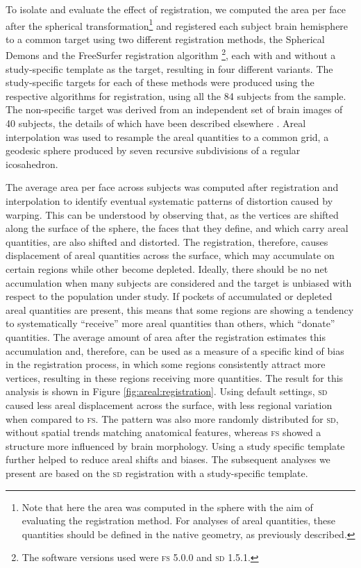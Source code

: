 To isolate and evaluate the effect of registration, we computed the area per face after the spherical transformation\footnote{Note that here the area was computed in the sphere with the aim of evaluating the registration method. For analyses of areal quantities, these quantities should be defined in the native geometry, as previously described.} and registered each subject brain hemisphere to a common target using two different registration methods, the Spherical Demons \citep{Yeo2010} and the FreeSurfer registration algorithm \citep{Fischl1999_intersubject}\footnote{The software versions used were \textsc{fs} 5.0.0 and \textsc{sd} 1.5.1.}, each with and without a study-specific template as the target, resulting in four different variants. The study-specific targets for each of these methods were produced using the respective algorithms for registration, using all the 84 subjects from the sample. The non-specific target was derived from an independent set of brain images of 40 subjects, the details of which have been described elsewhere \citep{Desikan2006}. Areal interpolation was used to resample the areal quantities to a common grid, a geodesic sphere produced by seven recursive subdivisions of a regular icosahedron.

The average area per face across subjects was computed after registration and interpolation to identify eventual systematic patterns of distortion caused by warping. This can be understood by observing that, as the vertices are shifted along the surface of the sphere, the faces that they define, and which carry areal quantities, are also shifted and distorted. The registration, therefore, causes displacement of areal quantities across the surface, which may accumulate on certain regions while other become depleted. Ideally, there should be no net accumulation when many subjects are considered and the target is unbiased with respect to the population under study. If pockets of accumulated or depleted areal quantities are present, this means that some regions are showing a tendency to systematically ``receive'' more areal quantities than others, which ``donate'' quantities. The average amount of area after the registration estimates this accumulation and, therefore, can be used as a measure of a specific kind of bias in the registration process, in which some regions consistently attract more vertices, resulting in these regions receiving more quantities. The result for this analysis is shown in Figure \ref{fig:areal:registration}. Using default settings, \textsc{sd} caused less areal displacement across the surface, with less regional variation when compared to \textsc{fs}. The pattern was also more randomly distributed for \textsc{sd}, without spatial trends matching anatomical features, whereas \textsc{fs} showed a structure more influenced by brain morphology. Using a study specific template further helped to reduce areal shifts and biases. The subsequent analyses we present are based on the \textsc{sd} registration with a study-specific template.

